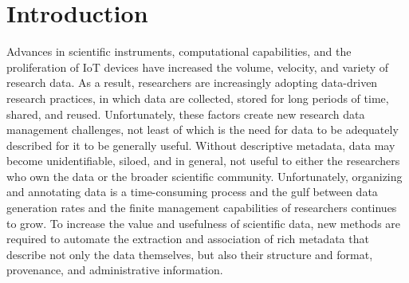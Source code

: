 \documentclass[sigconf]{acmart}
\begin{document}


\maketitle

\section{Introduction}

Advances in scientific instruments, computational capabilities, and the proliferation of IoT devices
have increased the volume, velocity, and variety of research data. 
As a result, researchers are increasingly adopting data-driven research practices, 
in which data are collected, stored for long periods of time, shared, 
and reused.
Unfortunately, these factors create new research data management challenges, 
not least of which is the need for data to be adequately described
for it to be generally useful. Without descriptive metadata, data
may become unidentifiable, siloed, and in general, 
not useful to either the researchers who own the data or the broader scientific community. 
Unfortunately, organizing and annotating data is a time-consuming process
and the gulf between data generation rates
and the finite management capabilities of researchers
continues to grow. %
To increase the value and usefulness of scientific data, 
new methods are required to automate the extraction and association 
of rich metadata that describe not only the data themselves, but
also their structure and format, provenance, and administrative information.
\end{document}
